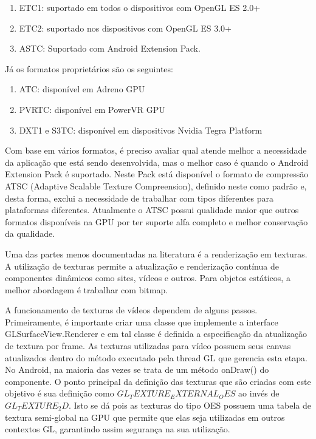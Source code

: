 \documentclass[sigconf]{acmart}
\begin{document}
\begin{enumerate}
    \item ETC1: suportado em todos o dispositivos com OpenGL ES 2.0+
    \item ETC2: suportado nos dispositivos com OpenGL ES 3.0+
    \item ASTC: Suportado com Android Extension Pack.
\end{enumerate}

Já os formatos proprietários são os seguintes:

\begin{enumerate}
    \item ATC: disponível em Adreno GPU
    \item PVRTC: disponível em PowerVR GPU
    \item DXT1 e S3TC: disponível em dispositivos Nvidia Tegra Platform
\end{enumerate}

Com base em vários formatos, é preciso avaliar qual atende melhor a necessidade da aplicação que está sendo desenvolvida, mas o melhor caso é quando o Android Extension Pack é suportado. Neste Pack está disponível o formato de compressão ATSC (Adaptive Scalable Texture Compreension), definido neste como padrão e, desta forma, exclui a necessidade de trabalhar com tipos diferentes para plataformas diferentes. Atualmente o ATSC possui qualidade maior que outros formatos disponíveis na GPU por ter suporte alfa completo e melhor conservação da qualidade.

Uma das partes menos documentadas na literatura é a renderização em texturas. A utilização de texturas permite a atualização e renderização contínua de componentes dinâmicos como sites, vídeos e outros. Para objetos estáticos, a melhor abordagem é trabalhar com bitmap.

A funcionamento de texturas de vídeos dependem de alguns passos. Primeiramente, é importante criar uma classe que implemente a interface GLSurfaceView.Renderer e em tal classe é definida a especificação da atualização de textura por frame. As texturas utilizadas para vídeo possuem seus canvas atualizados dentro do método executado pela thread GL que gerencia esta etapa. No Android, na maioria das vezes se trata de um método onDraw() do componente. O ponto principal da definição das texturas que são criadas com este objetivo é sua definição como $GL_TEXTURE_EXTERNAL_OES$ ao invés de $GL_TEXTURE_2D$. Isto se dá pois as texturas do tipo OES possuem uma tabela de textura semi-global na GPU que permite que elas seja utilizadas em outros contextos GL, garantindo assim segurança na sua utilização.
\end{document}
